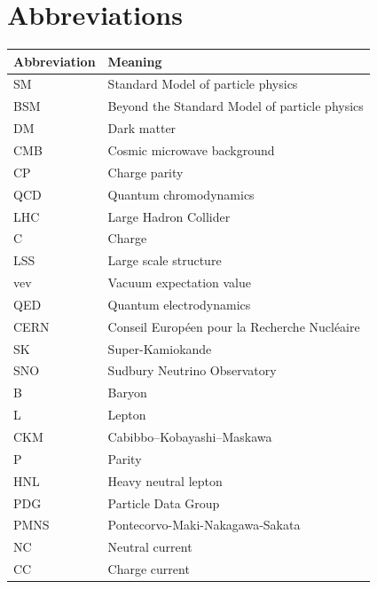 \chapter*{Abbreviations}
%
%
\begin{longtable}[l]{p{}p{}}
  \textbf{Abbreviation}&\textbf{Meaning}\\
  \midrule\endhead
    SM                      & Standard Model of particle physics\\
    BSM                     & Beyond the Standard Model of particle physics\\
    DM                      & Dark matter\\
    CMB                     & Cosmic microwave background\\
    CP                      & Charge parity\\
    QCD                     & Quantum chromodynamics\\
    LHC                     & Large Hadron Collider \\
    C                       & Charge\\
    LSS                     & Large scale structure\\
    vev                     & Vacuum expectation value \\
    QED                     & Quantum electrodynamics \\
    CERN                    & Conseil Européen pour la Recherche Nucléaire \\
    SK                      & Super-Kamiokande  \\
    SNO                     & Sudbury Neutrino Observatory \\
    B                       & Baryon\\
    L                       & Lepton\\
    CKM                     & Cabibbo–Kobayashi–Maskawa \\
    P                       & Parity\\
    HNL                     & Heavy neutral lepton \\
    PDG                     & Particle Data Group\\
    PMNS                    & Pontecorvo-Maki-Nakagawa-Sakata \\
    NC                      & Neutral current \\
    CC                      & Charge current \\

\end{longtable}
